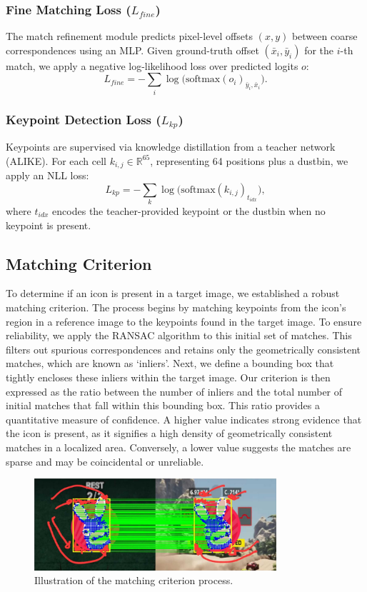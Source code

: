 \subsubsection{Fine Matching Loss ($L_{fine}$)}
The match refinement module predicts pixel-level offsets $(x,y)$ between coarse correspondences using an MLP.
Given ground-truth offset $(\bar{x}_i, \bar{y}_i)$ for the $i$-th match, we apply a negative log-likelihood loss over predicted logits $o$:
\begin{equation}
    L_{fine} = - \sum_i \log \big( \text{softmax}(o_i)_{\bar{y}_i, \bar{x}_i} \big).
\end{equation}

\subsubsection{Keypoint Detection Loss ($L_{kp}$)}
Keypoints are supervised via knowledge distillation from a teacher network (ALIKE).
For each cell $k_{i,j} \in \mathbb{R}^{65}$, representing 64 positions plus a dustbin, we apply an NLL loss:
\begin{equation}
    L_{kp} = - \sum_k \log \big( \text{softmax}(k_{i,j})_{t_{idx}} \big),
\end{equation}
where $t_{idx}$ encodes the teacher-provided keypoint or the dustbin when no keypoint is present.
\pagebreak
\medskip
\subsection{Matching Criterion}
To determine if an icon is present in a target image, we established a robust matching criterion. The process begins by matching keypoints from the icon's region in a reference image to the keypoints found in the target image. To ensure reliability, we apply the RANSAC algorithm to this initial set of matches. This filters out spurious correspondences and retains only the geometrically consistent matches, which are known as `inliers'. Next, we define a bounding box that tightly encloses these inliers within the target image. Our criterion is then expressed as the ratio between the number of inliers and the total number of initial matches that fall within this bounding box. This ratio provides a quantitative measure of confidence. A higher value indicates strong evidence that the icon is present, as it signifies a high density of geometrically consistent matches in a localized area. Conversely, a lower value suggests the matches are sparse and may be coincidental or unreliable.
\begin{figure}[H]
    \centering
    \includegraphics[width=0.8\textwidth]{ressources/test (1).jpg}
    \caption{Illustration of the matching criterion process.}
    \label{fig:matching_criterion}
\end{figure}